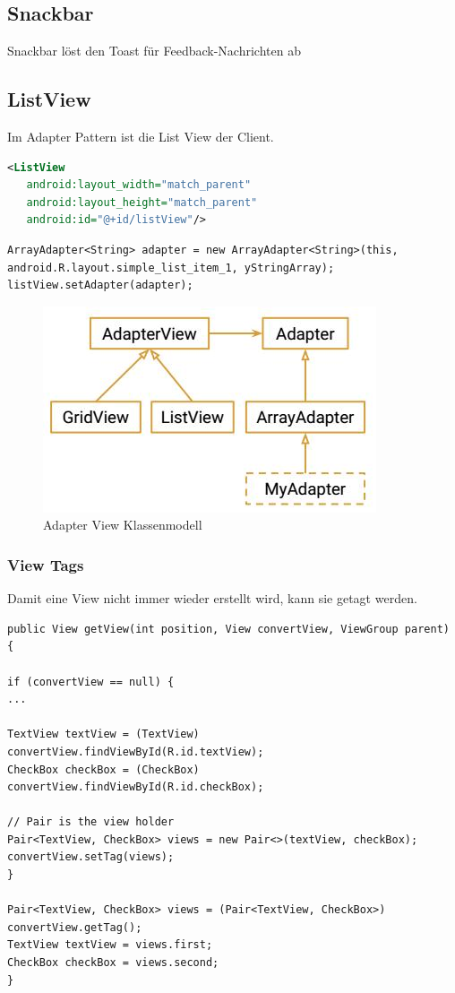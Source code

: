 \subsection{Snackbar}
Snackbar löst den Toast für Feedback-Nachrichten ab

\subsection{ListView}
Im Adapter Pattern ist die List View der Client.
\begin{lstlisting}[caption=List View XML Declaration, language=XML]
<ListView
   android:layout_width="match_parent"
   android:layout_height="match_parent"
   android:id="@+id/listView"/>
\end{lstlisting}

\begin{lstlisting}[caption=List View mit AdapterView]
ArrayAdapter<String> adapter = new ArrayAdapter<String>(this, android.R.layout.simple_list_item_1, yStringArray);
listView.setAdapter(adapter);
\end{lstlisting}

\begin{figure}[h]
\centering
\includegraphics[width=0.4\linewidth]{images/adapter_view}
\caption{Adapter View Klassenmodell}
\label{fig:adapterview}
\end{figure}

\subsubsection{View Tags}
Damit eine View nicht immer wieder erstellt wird, kann sie getagt werden.
\begin{lstlisting}[caption=ViewTag]
public View getView(int position, View convertView, ViewGroup parent) {

if (convertView == null) {
...

TextView textView = (TextView) convertView.findViewById(R.id.textView);
CheckBox checkBox = (CheckBox) convertView.findViewById(R.id.checkBox);

// Pair is the view holder
Pair<TextView, CheckBox> views = new Pair<>(textView, checkBox);
convertView.setTag(views);
}

Pair<TextView, CheckBox> views = (Pair<TextView, CheckBox>) convertView.getTag();
TextView textView = views.first;
CheckBox checkBox = views.second;
}
\end{lstlisting}


